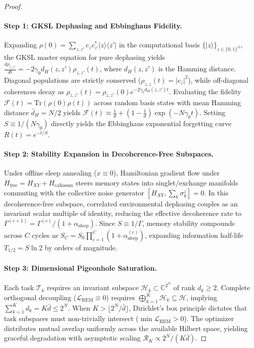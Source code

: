 \documentclass[10pt,twocolumn,3p]{article}
\begin{document}
\begin{proof}
\paragraph{Step 1: GKSL Dephasing and Ebbinghaus Fidelity.}
Expanding $\rho(0) = \sum_{z, z'} c_z c_{z'}^* |z\rangle \langle z'|$ in the computational basis $\{|z\rangle\}_{z \in \{0,1\}^N}$, the GKSL master equation for pure dephasing yields $\frac{d\rho_{z,z'}}{dt} = -2\gamma_0 d_H(z, z') \rho_{z, z'}(t)$, where $d_H(z, z')$ is the Hamming distance. Diagonal populations are strictly conserved ($\rho_{z,z}(t) = |c_z|^2$), while off-diagonal coherences decay as $\rho_{z,z'}(t) = \rho_{z,z'}(0) e^{-2\gamma_0 d_H(z, z') t}$. Evaluating the fidelity $\mathcal{F}(t) = \text{Tr}(\rho(0) \rho(t))$ across random basis states with mean Hamming distance $\bar{d}_H = N/2$ yields $\mathcal{F}(t) \approx \frac{1}{d} + (1 - \frac{1}{d}) \exp(-N\gamma_0 t)$. Setting $S \equiv 1/(N\gamma_0)$ directly yields the Ebbinghaus exponential forgetting curve $R(t) = e^{-t/S}$.

\paragraph{Step 2: Stability Expansion in Decoherence-Free Subspaces.}
Under offline sleep annealing ($x \equiv 0$), Hamiltonian gradient flow under $H_{\text{free}} = H_{XY} + H_{\text{callosum}}$ steers memory states into singlet/exchange manifolds commuting with the collective noise generator $[H_{XY}, \sum_k \sigma_k^z] = 0$. In this decoherence-free subspace, correlated environmental dephasing couples as an invariant scalar multiple of identity, reducing the effective decoherence rate to $\Gamma^{(c+1)} = \Gamma^{(c)} / (1 + \alpha_{\text{sleep}})$. Since $S \equiv 1/\Gamma$, memory stability compounds across $C$ cycles as $S_C = S_0 \prod_{c=1}^C (1 + \alpha_{\text{sleep}}^{(c)})$, expanding information half-life $T_{1/2} = S \ln 2$ by orders of magnitude.

\paragraph{Step 3: Dimensional Pigeonhole Saturation.}
Each task $\mathcal{T}_k$ requires an invariant subspace $\mathcal{H}_k \subset \mathbb{C}^{2^N}$ of rank $d_k \ge 2$. Complete orthogonal decoupling ($\mathcal{L}_{\text{REM}} \equiv 0$) requires $\bigoplus_{k=1}^K \mathcal{H}_k \subseteq \mathcal{H}$, implying $\sum_{k=1}^K d_k = K \bar{d} \le 2^N$. When $K > \lfloor 2^N / \bar{d} \rfloor$, Dirichlet's box principle dictates that task subspaces must non-trivially intersect ($\min \mathcal{L}_{\text{REM}} > 0$). The optimizer distributes mutual overlap uniformly across the available Hilbert space, yielding graceful degradation with asymptotic scaling $\mathcal{R}_K \propto 2^N / (K \bar{d})$.
\end{proof}
\end{document}

